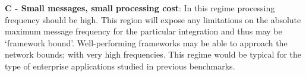 \documentclass[conference]{IEEEtran}
\begin{document}

\textbf{C - Small messages, small processing cost}: In this regime processing frequency should be high. This region will expose any limitations on the absolute maximum message frequency for the particular integration and thus may be `framework bound'. Well-performing frameworks may be able to approach the network bounds; with very high frequencies. This regime would be typical for the type of enterprise applications studied in previous benchmarks.%










\end{document}
